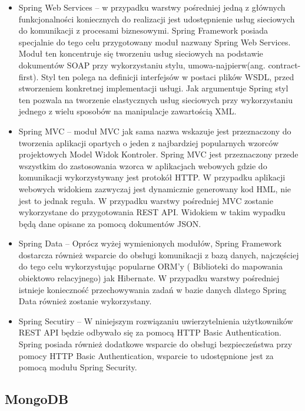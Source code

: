 \begin{itemize}

\item Spring Web Services  -- w przypadku warstwy pośredniej jedną z głównych funkcjonalności koniecznych do realizacji jest udostępnienie usług sieciowych do komunikacji z procesami biznesowymi. Spring Framework posiada specjalnie do tego celu przygotowany moduł nazwany Spring Web Services. Moduł ten koncentruje się tworzeniu usług sieciowych na podstawie dokumentów SOAP przy wykorzystaniu stylu, umowa-najpierw(ang. contract-first). Styl ten polega na definicji interfejsów w postaci plików WSDL, przed stworzeniem konkretnej implementacji usługi. Jak argumentuje Spring styl ten pozwala na tworzenie elastycznych usług sieciowych przy wykorzystaniu jednego z wielu sposobów na manipulacje zawartością XML.  ~\cite{springWS}

\item Spring MVC -- moduł MVC jak sama nazwa wskazuje jest przeznaczony do tworzenia aplikacji opartych o jeden z najbardziej popularnych wzorców projektowych Model Widok Kontroler. Spring MVC jest przeznaczony przede wszystkim do zastosowania wzorca w aplikacjach webowych gdzie do komunikacji wykorzystywany jest protokół HTTP. W przypadku aplikacji webowych widokiem zazwyczaj jest dynamicznie generowany kod HML, nie jest to jednak reguła. W przypadku warstwy pośredniej MVC zostanie wykorzystane do przygotowania REST API. Widokiem w takim wypadku będą dane opisane za pomocą dokumentów JSON. 

\item Spring Data -- Oprócz wyżej wymienionych modułów, Spring Framework dostarcza również wsparcie do obsługi komunikacji z bazą danych, najczęściej do tego celu wykorzystując popularne ORM'y ( Biblioteki do mapowania obiektowo relacyjnego) jak Hibernate. W przypadku warstwy pośredniej istnieje konieczność przechowywania zadań w bazie danych dlatego Spring Data również zostanie wykorzystany.

\item Spring Secutiry -- W niniejszym rozwiązaniu uwierzytelnienia użytkowników REST API będzie odbywało się za pomocą HTTP Basic Authentication. Spring posiada również dodatkowe wsparcie do obsługi bezpieczeństwa przy pomocy HTTP Basic Authentication, wsparcie to udostępnione jest za pomocą modułu Spring Security.   

\end{itemize}

\subsection{MongoDB}

